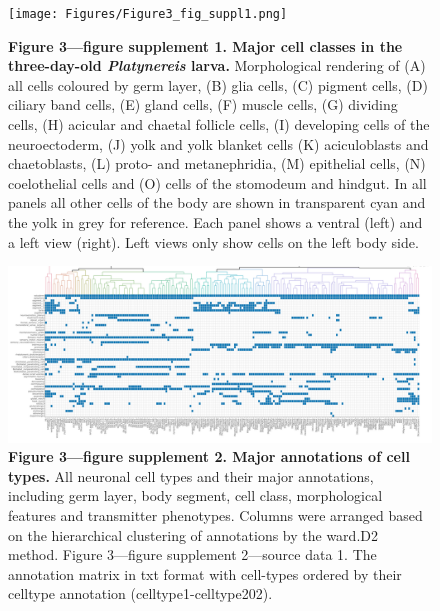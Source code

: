 \documentclass[
  11pt,
]{article}
\begin{document}
\begin{figure}[H]

{\centering \texttt{[image: Figures/Figure3\_fig\_suppl1.png]}

}

\caption{\textbf{Figure 3---figure supplement 1. Major cell classes in
the three-day-old \emph{Platynereis} larva.} Morphological rendering of
(A) all cells coloured by germ layer, (B) glia cells, (C) pigment cells,
(D) ciliary band cells, (E) gland cells, (F) muscle cells, (G) dividing
cells, (H) acicular and chaetal follicle cells, (I) developing cells of
the neuroectoderm, (J) yolk and yolk blanket cells (K) aciculoblasts and
chaetoblasts, (L) proto- and metanephridia, (M) epithelial cells, (N)
coelothelial cells and (O) cells of the stomodeum and hindgut. In all
panels all other cells of the body are shown in transparent cyan and the
yolk in grey for reference. Each panel shows a ventral (left) and a left
view (right). Left views only show cells on the left body side.}

\end{figure}%

\begin{figure}[H]

{\centering \includegraphics[width=1\textwidth,height=\textheight]{Figures/Figure3_fig_suppl2.png}

}

\caption{\textbf{Figure 3---figure supplement 2. Major annotations of
cell types.} All neuronal cell types and their major annotations,
including germ layer, body segment, cell class, morphological features
and transmitter phenotypes. Columns were arranged based on the
hierarchical clustering of annotations by the ward.D2 method. Figure
3---figure supplement 2---source data 1. The annotation matrix in txt
format with cell-types ordered by their celltype annotation
(celltype1-celltype202).}

\end{figure}%
\end{document}
